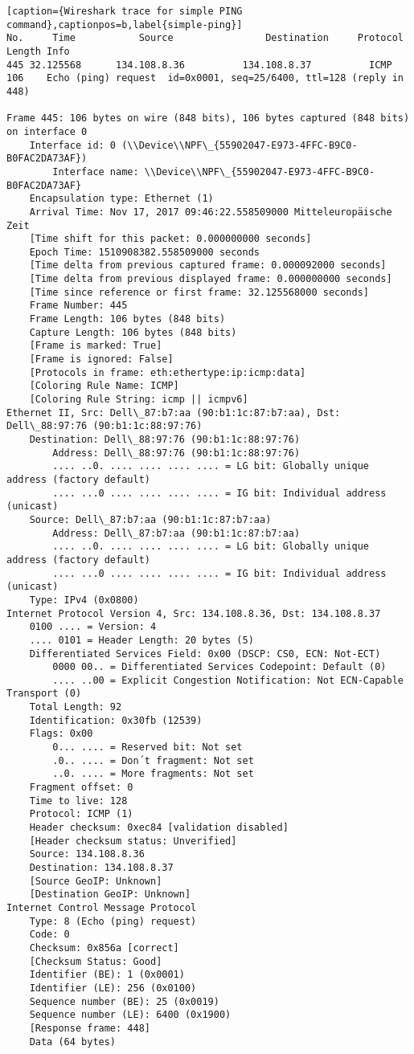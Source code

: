 \begin{lstlisting}[caption={Wireshark trace for simple PING command},captionpos=b,label{simple-ping}]
No.     Time           Source                Destination     Protocol   Length Info
445 32.125568      134.108.8.36          134.108.8.37          ICMP     106    Echo (ping) request  id=0x0001, seq=25/6400, ttl=128 (reply in 448)

Frame 445: 106 bytes on wire (848 bits), 106 bytes captured (848 bits) on interface 0
	Interface id: 0 (\\Device\\NPF\_{55902047-E973-4FFC-B9C0-B0FAC2DA73AF})
		Interface name: \\Device\\NPF\_{55902047-E973-4FFC-B9C0-B0FAC2DA73AF}
	Encapsulation type: Ethernet (1)
	Arrival Time: Nov 17, 2017 09:46:22.558509000 Mitteleuropäische Zeit
	[Time shift for this packet: 0.000000000 seconds]
	Epoch Time: 1510908382.558509000 seconds
	[Time delta from previous captured frame: 0.000092000 seconds]
	[Time delta from previous displayed frame: 0.000000000 seconds]
	[Time since reference or first frame: 32.125568000 seconds]
	Frame Number: 445
	Frame Length: 106 bytes (848 bits)
	Capture Length: 106 bytes (848 bits)
	[Frame is marked: True]
	[Frame is ignored: False]
	[Protocols in frame: eth:ethertype:ip:icmp:data]
	[Coloring Rule Name: ICMP]
	[Coloring Rule String: icmp || icmpv6]
Ethernet II, Src: Dell\_87:b7:aa (90:b1:1c:87:b7:aa), Dst: Dell\_88:97:76 (90:b1:1c:88:97:76)
	Destination: Dell\_88:97:76 (90:b1:1c:88:97:76)
		Address: Dell\_88:97:76 (90:b1:1c:88:97:76)
		.... ..0. .... .... .... .... = LG bit: Globally unique address (factory default)
		.... ...0 .... .... .... .... = IG bit: Individual address (unicast)
	Source: Dell\_87:b7:aa (90:b1:1c:87:b7:aa)
		Address: Dell\_87:b7:aa (90:b1:1c:87:b7:aa)
		.... ..0. .... .... .... .... = LG bit: Globally unique address (factory default)
		.... ...0 .... .... .... .... = IG bit: Individual address (unicast)
	Type: IPv4 (0x0800)
Internet Protocol Version 4, Src: 134.108.8.36, Dst: 134.108.8.37
	0100 .... = Version: 4
	.... 0101 = Header Length: 20 bytes (5)
	Differentiated Services Field: 0x00 (DSCP: CS0, ECN: Not-ECT)
		0000 00.. = Differentiated Services Codepoint: Default (0)
		.... ..00 = Explicit Congestion Notification: Not ECN-Capable Transport (0)
	Total Length: 92
	Identification: 0x30fb (12539)
	Flags: 0x00
		0... .... = Reserved bit: Not set
		.0.. .... = Don´t fragment: Not set
		..0. .... = More fragments: Not set
	Fragment offset: 0
	Time to live: 128
	Protocol: ICMP (1)
	Header checksum: 0xec84 [validation disabled]
	[Header checksum status: Unverified]
	Source: 134.108.8.36
	Destination: 134.108.8.37
	[Source GeoIP: Unknown]
	[Destination GeoIP: Unknown]
Internet Control Message Protocol
	Type: 8 (Echo (ping) request)
	Code: 0
	Checksum: 0x856a [correct]
	[Checksum Status: Good]
	Identifier (BE): 1 (0x0001)
	Identifier (LE): 256 (0x0100)
	Sequence number (BE): 25 (0x0019)
	Sequence number (LE): 6400 (0x1900)
	[Response frame: 448]
	Data (64 bytes)


\end{lstlisting}
